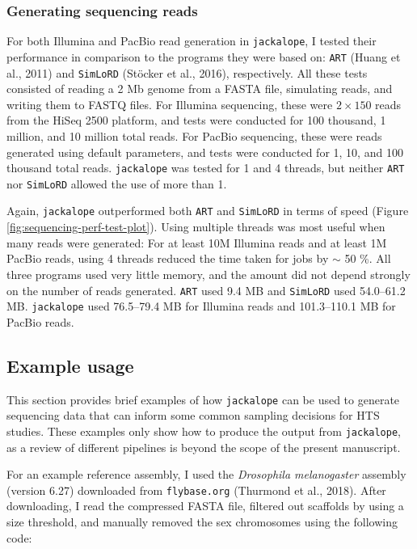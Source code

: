 \documentclass[12pt,]{article}
\begin{document}
\hypertarget{generating-sequencing-reads}{%
\subsubsection{Generating sequencing reads}\label{generating-sequencing-reads}}

For both Illumina and PacBio read generation in \texttt{jackalope}, I tested their performance
in comparison to the programs they were based on:
\texttt{ART} (Huang et al., 2011) and
\texttt{SimLoRD} (Stöcker et al., 2016), respectively.
All these tests consisted of reading a 2 Mb genome from a FASTA file, simulating
reads, and writing them to FASTQ files.
For Illumina sequencing, these were \(2 \times 150\) reads from the HiSeq 2500 platform,
and tests were conducted for 100 thousand, 1 million, and 10 million total reads.
For PacBio sequencing, these were reads generated using default parameters,
and tests were conducted for 1, 10, and 100 thousand total reads.
\texttt{jackalope} was tested for 1 and 4 threads, but
neither \texttt{ART} nor \texttt{SimLoRD} allowed the use of more than 1.

Again, \texttt{jackalope} outperformed both \texttt{ART} and \texttt{SimLoRD} in terms of speed
(Figure \ref{fig:sequencing-perf-test-plot}).
Using multiple threads was most useful when many reads were generated:
For at least 10M Illumina reads and at least 1M PacBio reads, using 4 threads
reduced the time taken for jobs by \(\sim\) 50 \%.
All three programs used very little memory, and the amount did not depend strongly
on the number of reads generated.
\texttt{ART} used 9.4 MB and \texttt{SimLoRD} used 54.0--61.2 MB.
\texttt{jackalope} used 76.5--79.4 MB for Illumina reads and 101.3--110.1 MB for PacBio reads.

\hypertarget{example-usage}{%
\subsection{Example usage}\label{example-usage}}

This section provides brief examples of how \texttt{jackalope} can be used
to generate sequencing data that can inform some common sampling decisions for HTS
studies.
These examples only show how to produce the output from \texttt{jackalope}, as
a review of different pipelines is beyond the scope of the present manuscript.

For an example reference assembly, I used the \emph{Drosophila melanogaster} assembly
(version 6.27) downloaded from \texttt{flybase.org} (Thurmond et al., 2018).
After downloading, I read the compressed FASTA file, filtered out
scaffolds by using a size threshold, and manually removed the sex chromosomes
using the following code:
\end{document}
